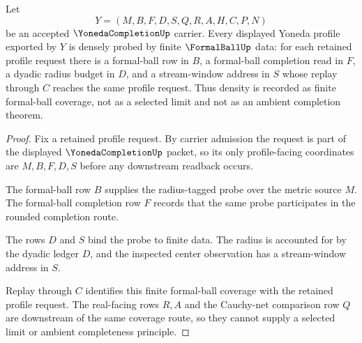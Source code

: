 \begin{theorem}
\label{thm:yoneda-completion-formal-ball-density}
Let
$$
Y=(M,B,F,D,S,Q,R,A,H,C,P,N)
$$
be an accepted $\YonedaCompletionUp$ carrier. Every displayed Yoneda profile exported by $Y$ is densely probed by finite $\FormalBallUp$ data: for each retained profile request there is a formal-ball row in $B$, a formal-ball completion read in $F$, a dyadic radius budget in $D$, and a stream-window address in $S$ whose replay through $C$ reaches the same profile request. Thus density is recorded as finite formal-ball coverage, not as a selected limit and not as an ambient completion theorem.
\end{theorem}
\begin{proof}
Fix a retained profile request. By carrier admission the request is part of the displayed $\YonedaCompletionUp$ packet, so its only profile-facing coordinates are $M,B,F,D,S$ before any downstream readback occurs.

The formal-ball row $B$ supplies the radius-tagged probe over the metric source $M$. The formal-ball completion row $F$ records that the same probe participates in the rounded completion route.

The rows $D$ and $S$ bind the probe to finite data. The radius is accounted for by the dyadic ledger $D$, and the inspected center observation has a stream-window address in $S$.

Replay through $C$ identifies this finite formal-ball coverage with the retained profile request. The real-facing rows $R,A$ and the Cauchy-net comparison row $Q$ are downstream of the same coverage route, so they cannot supply a selected limit or ambient completeness principle.
\end{proof}

